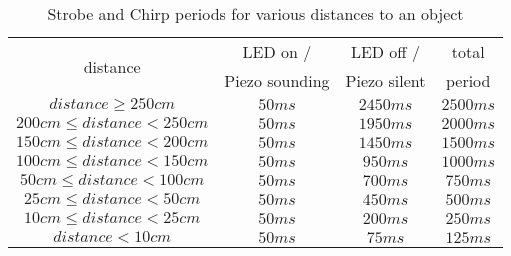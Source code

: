 \begin{table}
    \centering
    \begin{tabular}{||c|c|c|c||} \hline\hline
        \multirow{2}{*}{distance}   & LED on /         & LED off /         & total     \\
                                    & Piezo sounding    & Piezo silent      & period    \\ \hline\hline
        $distance \geq 250cm$          & $50ms$            & $2450ms$          & $2500ms$  \\ \hline
        $200cm \leq distance < 250cm$  & $50ms$            & $1950ms$          & $2000ms$  \\ \hline
        $150cm \leq distance < 200cm$  & $50ms$            & $1450ms$          & $1500ms$  \\ \hline
        $100cm \leq distance < 150cm$  & $50ms$            & $ 950ms$          & $1000ms$  \\ \hline
        $ 50cm \leq distance < 100cm$  & $50ms$            & $ 700ms$          & $ 750ms$  \\ \hline
        $ 25cm \leq distance <  50cm$  & $50ms$            & $ 450ms$          & $ 500ms$  \\ \hline
        $ 10cm \leq distance <  25cm$  & $50ms$            & $ 200ms$          & $ 250ms$  \\ \hline
        $distance < 10cm$           & $50ms$            & $  75ms$          & $ 125ms$  \\ \hline\hline
    \end{tabular}
    \caption{Strobe and Chirp periods for various distances to an object}\label{tab:alarmPeriods}
\end{table}